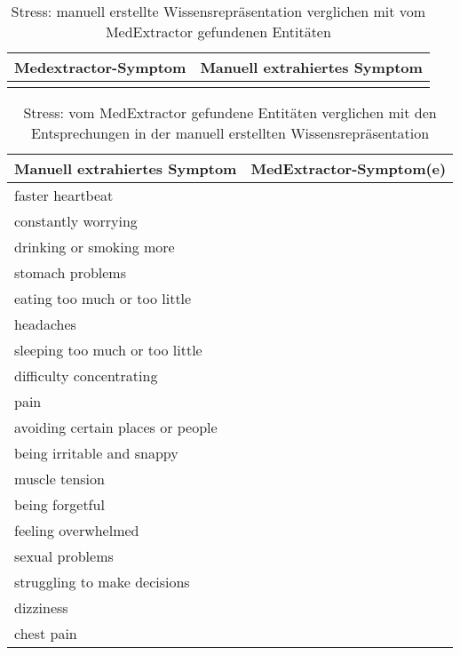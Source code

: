 \begin{table}[H]
\begin{center}
\begin{tabular}{ll}
\toprule
  Medextractor-Symptom &                       Manuell extrahiertes Symptom \\
\midrule
                &                                                \\
              
\bottomrule
\end{tabular}
\caption{Stress: manuell erstellte Wissensrepräsentation verglichen mit vom MedExtractor gefundenen Entitäten}
\label{tab:stress_vergleich_manuell_medextractor}
\end{center}
\end{table}


\begin{table}[H]
\begin{center}
\begin{tabular}{ll}
\toprule
                      Manuell extrahiertes Symptom &       MedExtractor-Symptom(e) \\
\midrule
                 faster heartbeat &               \\
              constantly worrying &               \\
         drinking or smoking more &               \\
                 stomach problems &               \\
    eating too much or too little &               \\
                        headaches &               \\
  sleeping too much or too little &               \\
         difficulty concentrating &               \\
                             pain &               \\
avoiding certain places or people &               \\
       being irritable and snappy &               \\
                   muscle tension &               \\
                  being forgetful &               \\
              feeling overwhelmed &               \\
                  sexual problems &               \\
     struggling to make decisions &               \\
                        dizziness &               \\
                       chest pain &               \\
\bottomrule
\end{tabular}
\caption{Stress: vom MedExtractor gefundene Entitäten verglichen mit den Entsprechungen in der manuell erstellten Wissensrepräsentation}
\label{tab:stress_medextractor_manuell}
\end{center}
\end{table}



